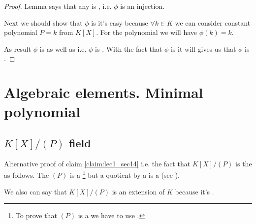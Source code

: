 \begin{claim}
\begin{proof}

    Lemma  says that any
     is ,
    i.e. $\phi$ is an injection.
    
    Next we should show that $\phi$ is  it's
    easy because $\forall k \in K$ we can consider constant polynomial
    $P = k$ from $K\left[X\right]$. For the polynomial we will have
    $\phi\left(k\right) = k$.

    As result $\phi$ is  as well as
     i.e. $\phi$ is
    . With the fact that $\phi$ is
     it will gives us that $\phi$ is
    . 
  \end{proof}
\end{claim}

\section{Algebraic elements. Minimal polynomial}

\subsection{$K\left[X\right]/\left(P\right)$ field}

Alternative proof of claim \ref{claim:lec1_sec14} i.e. the fact that
$K\left[X\right]/\left(P\right)$ is the 
 as follows.
The $\left(P\right)$ is a 
\footnote{
  To prove that $\left(P\right)$ is a  we have
  to use .
}
but a quotient by a   is a 
(see ).

We also can say that $K\left[X\right]/\left(P\right)$ is an extension
of $K$ because it's 
.

